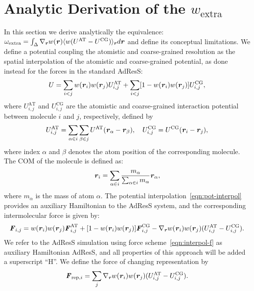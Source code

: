 \documentclass[a4paper,preprint,unsortedaddress]{revtex4-1}
\newcommand{\recheck}[1]{{\color{red} #1}}
\newcommand{\vect}[1]{\textbf{\textit{#1}}}
\newcommand{\AT}{{\textrm{{AT}}}}
\newcommand{\CG}{{\textrm{CG}}}
\newcommand{\res}{{\textrm{rep}}}
\newcommand{\ext}{{\textrm{extra}}}
\begin{document}
\section{Analytic Derivation of the $w_{\ext}$}\label{sec:tmp4}
\recheck{In this section we derive analytically the equivalence:
  $\omega_{\ext}=\int_{\Delta}\nabla_{\vect r} w(\vect r) \langle w(U^{\AT}-U^{\CG})\rangle_{\vect r} d{\vect r}$ and define its conceptual limitations.
We define a potential coupling the atomistic and coarse-grained resolution as the spatial interpolation of the atomistic and coarse-grained potential, as done instead for the forces in the standard AdResS:
\begin{align}
  U =
  \sum_{i<j} w(\vect r_i) w(\vect r_j)
  U^\AT_{i,j}
  +
  \sum_{i<j}[1- w(\vect r_i) w(\vect r_j)]
  U^\CG_{i,j},
\end{align}
where $U^\AT_{i,j}$ and $U^\CG_{i,j}$ are the atomistic and coarse-grained interaction potential between molecule $i$ and $j$, respectively, defined by
\begin{align}\label{eqn:pot-interpol}
  U^\AT_{i,j} =
  \sum_{\alpha\in i}\sum_{\beta\in j} U^\AT(\vect r_\alpha - \vect r_\beta),\quad
  U^\CG_{i,j} =
  U^\CG(\vect r_i - \vect r_j),
\end{align}
where index $\alpha$ and $\beta$ denotes the atom position of the corresponding molecule.
The COM of the molecule is defined as:
\begin{align}
  \vect r_i = \sum_{\alpha\in i} \frac{m_\alpha}{\sum_{\alpha\in i} m_\alpha} \vect r_\alpha,
\end{align}
where $m_\alpha$ is the mass of atom $\alpha$.
\recheck{The potential interpolation~\eqref{eqn:pot-interpol} provides an auxiliary Hamiltonian to the AdResS system, and
the
corresponding intermolecular force is given by:}
\begin{align}\label{eqn:interpol-f}
  \vect F_{i,j} =
  w(\vect r_i) w(\vect r_j)
  \vect F^\AT_{i,j}
  +
  [1- w(\vect r_i) w(\vect r_j)]
  \vect F_{i,j}^\CG
  -
  \nabla_{\vect r} w(\vect r_i) w(\vect r_j)
  (U^\AT_{i,j} - U^\CG_{i,j}).
\end{align}
\recheck{We refer to the AdResS simulation using force scheme~\eqref{eqn:interpol-f} as
  auxiliary Hamiltonian AdResS, and all properties of this approach will be added a superscript ``H''}.
We define the force of changing representation by
\begin{align}\label{eqn:frep}
  \vect F_{\res,i} = 
  \sum_j \nabla_{\vect r} w(\vect r_i) w(\vect r_j)
  (U^\AT_{i,j} - U^\CG_{i,j}).
\end{align}


}
\end{document}

